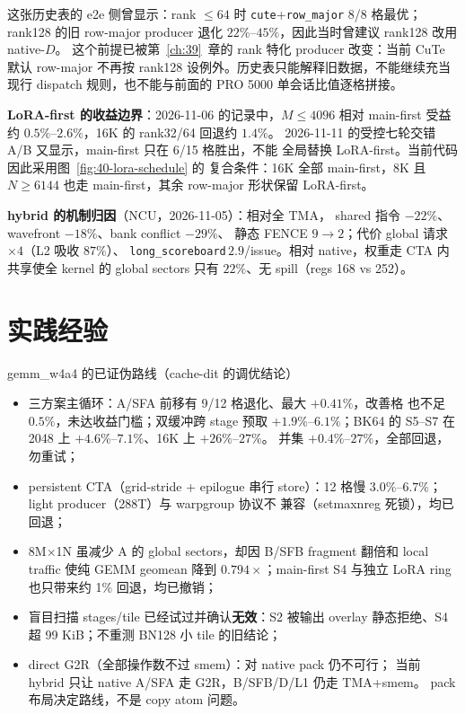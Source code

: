 这张历史表的 e2e 侧曾显示：rank $\le64$ 时
\texttt{cute}+\texttt{row\_major} 8/8 格最优；rank128 的旧 row-major
producer 退化 $22\%$--$45\%$，因此当时曾建议 rank128 改用 native-$D$。
这个前提已被第~\ref{ch:39}~章的 rank 特化 producer 改变：当前 CuTe 默认
row-major 不再按 rank128 设例外。历史表只能解释旧数据，不能继续充当现行
dispatch 规则，也不能与前面的 PRO 5000 单会话比值逐格拼接。

\textbf{LoRA-first 的收益边界}：2026-11-06 的记录中，$M\le4096$ 相对
main-first 受益约 $0.5\%$--$2.6\%$，16K 的 rank32/64 回退约 $1.4\%$。
2026-11-11 的受控七轮交错 A/B 又显示，main-first 只在 6/15 格胜出，不能
全局替换 LoRA-first。当前代码因此采用图~\ref{fig:40-lora-schedule} 的
复合条件：16K 全部 main-first，8K 且 $N\ge6144$ 也走 main-first，其余
row-major 形状保留 LoRA-first。

\textbf{hybrid 的机制归因}（NCU，2026-11-05）：相对全 TMA，
shared 指令 $-22\%$、wavefront $-18\%$、bank conflict $-29\%$、
静态 FENCE $9\to2$；代价 global 请求 $\times4$（L2 吸收 $87\%$）、
\texttt{long\_scoreboard}$\,2.9$/issue。相对 native，权重走 CTA 内
共享使全 kernel 的 global sectors 只有 $22\%$、无 spill（regs 168 vs 252）。

\section{实践经验}

\begin{kaogu}[F4]{gemm\_w4a4 的已证伪路线（cache-dit 的调优结论）}
\begin{itemize}[itemsep=0.5pt,topsep=1pt]
  \item 三方案主循环：A/SFA 前移有 9/12 格退化、最大 $+0.41\%$，改善格
        也不足 $0.5\%$，未达收益门槛；双缓冲跨 stage 预取 $+1.9\%$--$6.1\%$；BK64 的
        S5--S7 在 2048 上 $+4.6\%$--$7.1\%$、16K 上 $+26\%$--$27\%$。
        并集 $+0.4\%$--$27\%$，全部回退，勿重试；
  \item persistent CTA（grid-stride + epilogue 串行 store）：12 格慢
        $3.0\%$--$6.7\%$；light producer（288T）与 warpgroup 协议不
        兼容（setmaxnreg 死锁），均已回退；
  \item 8M$\times$1N 虽减少 A 的 global sectors，却因 B/SFB fragment 翻倍和
        local traffic 使纯 GEMM geomean 降到 $0.794\times$；main-first S4
        与独立 LoRA ring 也只带来约 1\% 回退，均已撤销；
  \item 盲目扫描 stages/tile 已经试过并确认\textbf{无效}：S2 被输出 overlay
        静态拒绝、S4 超 99 KiB；不重测 BN128 小 tile 的旧结论；
  \item direct G2R（全部操作数不过 smem）：对 native pack 仍不可行；
        当前 hybrid 只让 native A/SFA 走 G2R，B/SFB/D/L1 仍走 TMA+smem。
        pack 布局决定路线，不是 copy atom 问题。
\end{itemize}
\end{kaogu}

